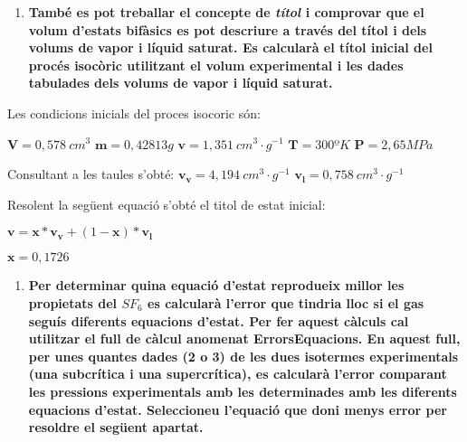 \documentclass[a4paper]{article}
\begin{document}
\begin{enumerate}[resume]
    \item \textbf{També es pot treballar el concepte de \emph{títol} i comprovar que el volum d’estats bifàsics es pot descriure a través del títol i dels volums de vapor i líquid saturat. Es calcularà el títol inicial del procés isocòric utilitzant el volum experimental i les dades tabulades dels volums de vapor i líquid saturat.}
\end{enumerate}
Les condicions inicials del proces isocoric són:
		
	$\boldsymbol{V} = 0,578\ cm^3$	
	$\boldsymbol{m} = 0,42813 g$	
	$\boldsymbol{v} = 1,351\ cm^3·g^{-1}$	
	$\boldsymbol{T} = 300 ºK$	
	$\boldsymbol{P} = 2,65 MPa$
	
	Consultant a les taules s'obté:
	$\boldsymbol{v_v} = 4,194\ cm^3·g^{-1} $
	$\boldsymbol{v_l} = 0,758\ cm^3·g^{-1} $
	
	Resolent la següent equació s'obté el titol de estat inicial:
	
	$\boldsymbol{v} = \boldsymbol{x}* \boldsymbol{v_v} + (1- \boldsymbol{x}) * \boldsymbol{v_l}$
	
	$\boldsymbol{x} = 0,1726 $
	
	

\begin{enumerate}[resume]
    \item \textbf{Per determinar quina equació d’estat reprodueix millor les propietats del $SF_6$ es calcularà l’error que tindria lloc si el gas seguís diferents equacions d’estat. Per fer aquest càlculs cal utilitzar el full de càlcul anomenat \textbf{ErrorsEquacions}. En aquest full, per unes quantes dades (2 o 3) de les dues isotermes experimentals (una subcrítica i una supercrítica), es calcularà l’error comparant les pressions experimentals amb les determinades amb les diferents equacions d’estat. Seleccioneu l’equació que doni menys error per resoldre el següent apartat.}
\end{enumerate}
\end{document}
